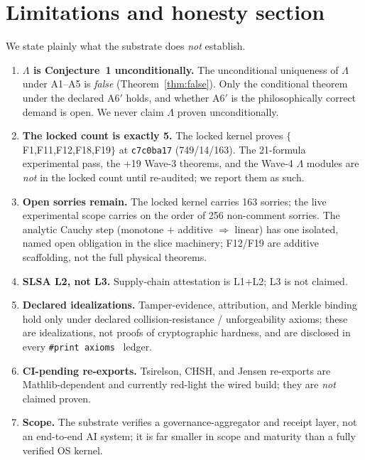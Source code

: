 \documentclass[11pt]{article}
\theoremstyle{plain}
\theoremstyle{definition}
\theoremstyle{remark}
\newcommand{\La}{\Lambda}
\newcommand{\printax}[1]{\texttt{\#print axioms}~\texttt{#1}}
\begin{document}
\section{Limitations and honesty section}
\label{sec:limits}

We state plainly what the substrate does \emph{not} establish.

\begin{enumerate}[leftmargin=2em,itemsep=3pt]
  \item \textbf{$\La$ is Conjecture~1 unconditionally.} The unconditional uniqueness of
    $\La$ under A1--A5 is \emph{false} (Theorem~\ref{thm:false}). Only the conditional
    theorem under the declared A6$'$ holds, and whether A6$'$ is the philosophically
    correct demand is open. We never claim $\La$ proven unconditionally.
  \item \textbf{The locked count is exactly 5.} The locked kernel proves
    $\{$F1,F11,F12,F18,F19$\}$ at \texttt{c7c0ba17} (749/14/163). The 21-formula
    experimental pass, the +19 Wave-3 theorems, and the Wave-4 $\La$ modules are
    \emph{not} in the locked count until re-audited; we report them as such.
  \item \textbf{Open sorries remain.} The locked kernel carries 163 sorries; the
    live experimental scope carries on the order of 256 non-comment sorries. The
    analytic Cauchy step (monotone $+$ additive $\Rightarrow$ linear) has one isolated,
    named open obligation in the slice machinery; F12/F19 are additive scaffolding,
    not the full physical theorems.
  \item \textbf{SLSA L2, not L3.} Supply-chain attestation is L1+L2; L3 is not claimed.
  \item \textbf{Declared idealizations.} Tamper-evidence, attribution, and Merkle
    binding hold only under declared collision-resistance / unforgeability axioms; these
    are idealizations, not proofs of cryptographic hardness, and are disclosed in every
    \printax{} ledger.
  \item \textbf{CI-pending re-exports.} Tsirelson, CHSH, and Jensen re-exports are
    Mathlib-dependent and currently red-light the wired build; they are \emph{not}
    claimed proven.
  \item \textbf{Scope.} The substrate verifies a governance-aggregator and receipt
    layer, not an end-to-end AI system; it is far smaller in scope and maturity than a
    fully verified OS kernel.
\end{enumerate}
\end{document}
